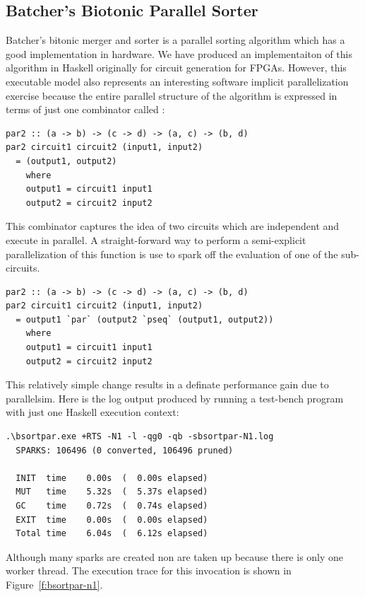 \subsection{Batcher's Biotonic Parallel Sorter}
Batcher's bitonic merger and sorter is a parallel sorting algorithm which has a good implementation in hardware. We have produced an implementaiton of this algorithm in Haskell originally for circuit generation for FPGAs. However, this executable model also represents an interesting software implicit parallelization exercise because the entire parallel structure of the algorithm is expressed in terms of just one combinator called :

\begin{lstlisting}
par2 :: (a -> b) -> (c -> d) -> (a, c) -> (b, d)
par2 circuit1 circuit2 (input1, input2)
  = (output1, output2)
    where
    output1 = circuit1 input1
    output2 = circuit2 input2
\end{lstlisting}

This combinator captures the idea of two circuits which are independent and execute in parallel. A straight-forward way to perform a semi-explicit parallelization of this function is use  to spark off the evaluation of one of the sub-circuits.

\begin{lstlisting}
par2 :: (a -> b) -> (c -> d) -> (a, c) -> (b, d)
par2 circuit1 circuit2 (input1, input2)
  = output1 `par` (output2 `pseq` (output1, output2))
    where
    output1 = circuit1 input1
    output2 = circuit2 input2
\end{lstlisting}

This relatively simple change results in a definate performance gain due to parallelsim. Here is the log output produced by running a test-bench program with just one Haskell execution context:

\begin{verbatim}
.\bsortpar.exe +RTS -N1 -l -qg0 -qb -sbsortpar-N1.log
  SPARKS: 106496 (0 converted, 106496 pruned)

  INIT  time    0.00s  (  0.00s elapsed)
  MUT   time    5.32s  (  5.37s elapsed)
  GC    time    0.72s  (  0.74s elapsed)
  EXIT  time    0.00s  (  0.00s elapsed)
  Total time    6.04s  (  6.12s elapsed)
\end{verbatim}

Although many sparks are created non are taken up because there is only one worker thread. The execution trace for this invocation is shown in Figure~\ref{f:bsortpar-n1}.

